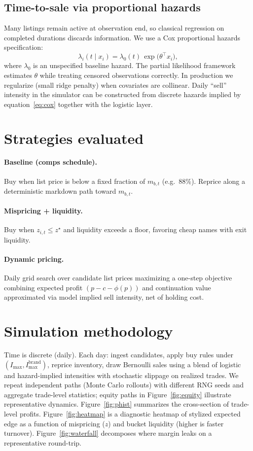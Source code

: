 \documentclass[11pt,a4paper]{article}
\begin{document}
\subsection{Time-to-sale via proportional hazards}
Many listings remain active at observation end, so classical regression on completed durations
discards information. We use a Cox proportional hazards specification:
\begin{equation}
  \lambda_i(t \mid x_i) = \lambda_0(t)\,\exp\bigl(\theta^\top x_i\bigr),
  \label{eq:cox}
\end{equation}
where $\lambda_0$ is an unspecified baseline hazard. The partial likelihood framework estimates
$\theta$ while treating censored observations correctly. In production we regularize (small ridge
penalty) when covariates are collinear. Daily ``sell'' intensity in the simulator can be
constructed from discrete hazards implied by equation~\eqref{eq:cox} together with the logistic layer.

\section{Strategies evaluated}
\paragraph{Baseline (comps schedule).} Buy when list price is below a fixed fraction of $m_{b,t}$
(e.g.\ 88\%). Reprice along a deterministic markdown path toward $m_{b,t}$.

\paragraph{Mispricing + liquidity.} Buy when $z_{i,t} \le z^\star$ and liquidity exceeds a floor,
favoring cheap names with exit liquidity.

\paragraph{Dynamic pricing.} Daily grid search over candidate list prices maximizing a one-step
objective combining expected profit $(p-c-\phi(p))$ and continuation value approximated via model
implied sell intensity, net of holding cost.

\section{Simulation methodology}
Time is discrete (daily). Each day: ingest candidates, apply buy rules under
$(I_{\max}, I^{\mathrm{brand}}_{\max})$, reprice inventory, draw Bernoulli sales using a blend of
logistic and hazard-implied intensities with stochastic slippage on realized trades. We repeat
independent paths (Monte Carlo rollouts) with different RNG seeds and aggregate trade-level
statistics; equity paths in Figure~\ref{fig:equity} illustrate representative dynamics.
Figure~\ref{fig:phist} summarizes the cross-section of trade-level profits.
Figure~\ref{fig:heatmap} is a diagnostic heatmap of stylized expected edge as a function of
mispricing ($z$) and bucket liquidity (higher is faster turnover). Figure~\ref{fig:waterfall}
decomposes where margin leaks on a representative round-trip.
\end{document}
